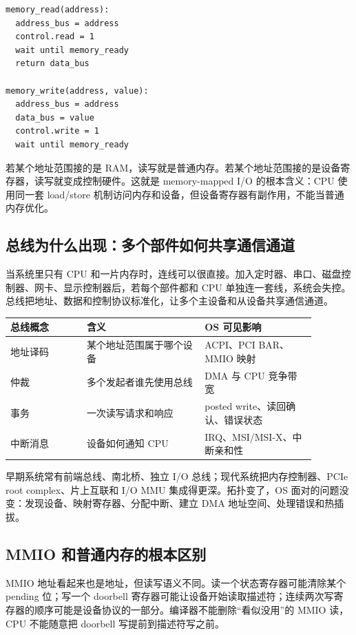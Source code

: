 \begin{lstlisting}
memory_read(address):
  address_bus = address
  control.read = 1
  wait until memory_ready
  return data_bus

memory_write(address, value):
  address_bus = address
  data_bus = value
  control.write = 1
  wait until memory_ready
\end{lstlisting}

若某个地址范围接的是 RAM，读写就是普通内存。若某个地址范围接的是设备寄存器，读写就变成控制硬件。这就是 memory-mapped I/O 的根本含义：CPU 使用同一套 load/store 机制访问内存和设备，但设备寄存器有副作用，不能当普通内存优化。

\subsection{总线为什么出现：多个部件如何共享通信通道}

当系统里只有 CPU 和一片内存时，连线可以很直接。加入定时器、串口、磁盘控制器、网卡、显示控制器后，若每个部件都和 CPU 单独连一套线，系统会失控。总线把地址、数据和控制协议标准化，让多个主设备和从设备共享通信通道。

\begin{longtable}{p{0.22\linewidth}p{0.34\linewidth}p{0.32\linewidth}}
\toprule
总线概念 & 含义 & OS 可见影响 \\
\midrule
地址译码 & 某个地址范围属于哪个设备 & ACPI、PCI BAR、MMIO 映射 \\
仲裁 & 多个发起者谁先使用总线 & DMA 与 CPU 竞争带宽 \\
事务 & 一次读写请求和响应 & posted write、读回确认、错误状态 \\
中断消息 & 设备如何通知 CPU & IRQ、MSI/MSI-X、中断亲和性 \\
\bottomrule
\end{longtable}

早期系统常有前端总线、南北桥、独立 I/O 总线；现代系统把内存控制器、PCIe root complex、片上互联和 I/O MMU 集成得更深。拓扑变了，OS 面对的问题没变：发现设备、映射寄存器、分配中断、建立 DMA 地址空间、处理错误和热插拔。

\subsection{MMIO 和普通内存的根本区别}

MMIO 地址看起来也是地址，但读写语义不同。读一个状态寄存器可能清除某个 pending 位；写一个 doorbell 寄存器可能让设备开始读取描述符；连续两次写寄存器的顺序可能是设备协议的一部分。编译器不能删除“看似没用”的 MMIO 读，CPU 不能随意把 doorbell 写提前到描述符写之前。

